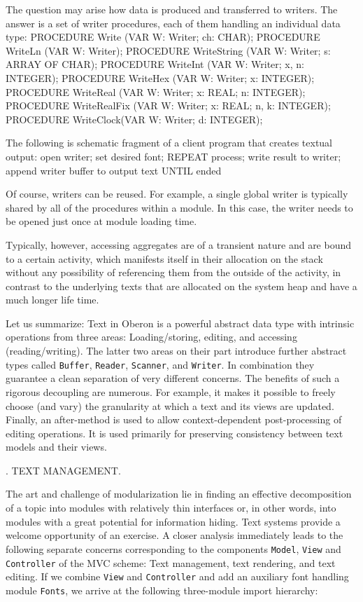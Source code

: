 The question may arise how data is produced and transferred to
writers. The answer is a set of writer procedures, each of them
handling an individual data type:
\begintt
PROCEDURE Write (VAR W: Writer; ch: CHAR);
PROCEDURE WriteLn (VAR W: Writer);
PROCEDURE WriteString (VAR W: Writer; s: ARRAY OF CHAR);
PROCEDURE WriteInt (VAR W: Writer; x, n: INTEGER);
PROCEDURE WriteHex (VAR W: Writer; x: INTEGER);
PROCEDURE WriteReal (VAR W: Writer; x: REAL; n: INTEGER);
PROCEDURE WriteRealFix (VAR W: Writer; x: REAL; n, k: INTEGER);
PROCEDURE WriteClock(VAR W: Writer; d: INTEGER);
\endtt

\noindent The following is schematic fragment of a client program that creates textual output:
\begintt
open writer; set desired font;
REPEAT
  process;
  write result to writer;
  append writer buffer to output text
UNTIL ended
\endtt

\noindent Of course, writers can be reused. For example, a single global writer
is typically shared by all of the procedures within a module. In this
case, the writer needs to be opened just once at module loading time.

Typically, however, accessing aggregates are of a transient nature and
are bound to a certain activity, which manifests itself in their
allocation on the stack without any possibility of referencing them
from the outside of the activity, in contrast to the underlying texts
that are allocated on the system heap and have a much longer life
time.

Let us summarize: Text in Oberon is a powerful abstract data type with
intrinsic operations from three areas: Loading/storing, editing, and
accessing (reading/writing). The latter two areas on their part
introduce further abstract types called {\tt Buffer\/}, {\tt Reader\/}, {\tt Scanner\/}, and
{\tt Writer\/}. In combination they guarantee a clean separation of very
different concerns. The benefits of such a rigorous decoupling are
numerous. For example, it makes it possible to freely choose (and
vary) the granularity at which a text and its views are
updated. Finally, an after-method is used to allow context-dependent
post-processing of editing operations. It is used primarily for
preserving consistency between text models and their views.

. TEXT MANAGEMENT.

The art and challenge of modularization lie in finding an effective
decomposition of a topic into modules with relatively thin interfaces
or, in other words, into modules with a great potential for
information hiding. Text systems provide a welcome opportunity of an
exercise. A closer analysis immediately leads to the following
separate concerns corresponding to the components {\tt Model\/}, {\tt View\/} and
{\tt Controller\/} of the MVC scheme: Text management, text rendering, and
text editing. If we combine {\tt View\/} and {\tt Controller\/} and add an auxiliary
font handling module {\tt Fonts\/}, we arrive at the following three-module
import hierarchy:

